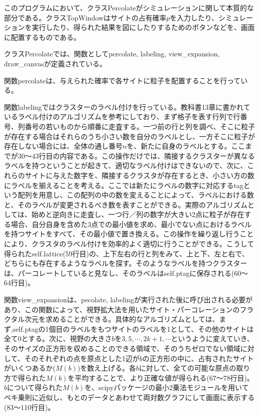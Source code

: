 \documentclass{jsarticle}
\begin{document}
        
        このプログラムにおいて、クラスPercolateがシミュレーションに関して本質的な部分である。クラスTopWindowはサイトの占有確率$p$を入力したり、シミュレーションを実行したり、得られた結果を図にしたりするためのボタンなどを、画面に配置するものである。
        
        クラスPercolateでは、関数としてpercolate, labeling, view\_expansion, draw\_canvasが定義されている。
        
        関数percolateは、与えられた確率で各サイトに粒子を配置することを行っている。
        
        関数labelingではクラスターのラベル付けを行っている。教科書\cite{cite1}13章に書かれているラベル付けのアルゴリズムを参考にしており、まず格子を表す行列で行番号、列番号の若いものから順番に走査する。一つ前の行と列を調べ、そこに粒子が存在する場合はそれらのうち小さい数を自分のラベルとし、一方そこに粒子が存在しない場合には、全体の通し番号$n$を、新たに自身のラベルとする。ここまでが30〜43行目の内容である。この操作だけでは、隣接するクラスターが異なるラベルを持つということが起きて、適切なラベル付けはできないので、次に、これらのサイトに与えた数字を、隣接するクラスタが存在するとき、小さい方の数にラベルを揃えることを考える。ここでは新たにラベルの数字に対応するtagという配列を用意し、この配列の中の数を変えることによって、ラベルにおける数と、そのラベルが変更されるべき数を表すことができる。実際のアルゴリズムとしては、始めと逆向きに走査し、一つ行／列の数字が大きい2点に粒子が存在する場合、自分自身を含めた3点での最小値を求め、最小でない点におけるラベルを持つサイトをすべて、その最小値で置き換える。この操作を繰り返し行うことにより、クラスタのラベル付けを効率的よく適切に行うことができる。こうして得られたself.lattice(59行目)の、上下左右の行と列をみて、上と下、左と右で、どちらにも存在するようなラベルを探す。そのようなラベルを持つクラスターは、パーコレートしていると見なし、そのラベルはself.ptagに保存される(60〜64行目)。
        
        関数view\_expansionは、pecolate, labelingが実行された後に呼び出される必要があり、この関数によって、視野拡大法を用いたサイト・パーコレーションのフラクタル次元を求めることができる。具体的なアルゴリズムとしては、まず,self.ptagの1個目のラベルをもつサイトのラベルを1として、その他のサイトは全て0とする。次に、視野の大きさ$b$を$3, 5, \cdots, 2k+1, \cdots$というように変えていき、そのサイズの正方形を収めることのできる領域で、そのうちゼロでない領域に対して、そのそれぞれの点を原点とした1辺が$b$の正方形の中に、占有されたサイトがいくつあるか($M(b)$)を数え上げる。各$b$に対して、全ての可能な原点の取り方で得られた$M(b)$を平均することで、より正確な値が得られる(67〜78行目)。$b$について得られた$M(b)$を、scipyパッケージの最小2乗法モジュールを用いてベキ乗則に近似し、もとのデータとあわせて両対数グラフにして画面に表示する(83〜110行目)。
        
\end{document}
